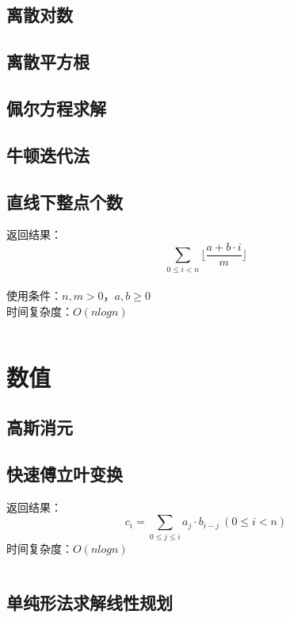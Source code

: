 \documentclass[a4paper]{article}
\newcommand{\cppcode}[1]{
    \inputminted[mathescape]{cpp}{source/#1}
}
\begin{document}
\subsection{离散对数}

\subsection{离散平方根}

\subsection{佩尔方程求解}

\subsection{牛顿迭代法}

\subsection{直线下整点个数}

返回结果：$$\sum_{0 \leq i < n} \lfloor \frac{a + b \cdot i}{m} \rfloor$$\\
\indent 使用条件：$n, m > 0$，$a, b \geq 0$\\
\indent 时间复杂度：$O(n log n)$

\cppcode{number-theory/lattice-count.cpp}

\section{数值}

\subsection{高斯消元}

\subsection{快速傅立叶变换}

返回结果：$$c_i=\sum_{0 \leq j \leq i} a_j \cdot b_{i-j} \ (0 \leq i < n)$$
\indent 时间复杂度：$O(n log n)$

\cppcode{numerical-algorithm/fast-fourier-transform.cpp}

\subsection{单纯形法求解线性规划}
\end{document}
